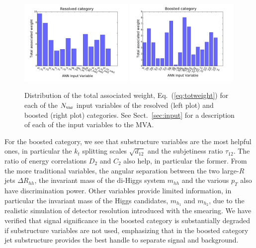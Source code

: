 \begin{figure}[t]
\begin{center}
\includegraphics[width=0.49\textwidth]{plots/res_wgthist.pdf}
\includegraphics[width=0.49\textwidth]{plots/boosted_wgthist.pdf}
\vspace{-0.5cm}
\caption{\small
Distribution of the total associated weight,
Eq.~(\ref{eq:totweight}) for each of the $N_{\rm var}$ input
variables of the resolved (left plot) and boosted (right plot) categories.
%
See Sect.~\ref{sec:input} for a description of each of the input
variables to the MVA.
}
\label{fig:nnweights}
\end{center}
\end{figure}




For the boosted category, we see that substructure variables
are the most helpful ones, in particular the $k_t$ splitting scales
$\sqrt{d_{12}}$ and the subjetiness ratio $\tau_{12}$.
%
The ratio of energy correlations $D_2$ and $C_2$ also help,
in particular the former.
%
From the more traditional variables, the angular
separation between the two large-$R$ jets $\Delta R_{hh}$,
the invariant mass of the di-Higgs system $m_{hh}$ and the various
$p_T$ also have discrimination power.
%
Other variables provide limited information, in particular the invariant
mass of the Higgs candidates, $m_{h_1}$ and $m_{h_2}$, due to the realistic
simulation of detector resolution introduced with the smearing.
%
We have verified that signal significance in the boosted category is substantially
degraded if substructure variables are not used, emphasizing that
in the boosted category jet substructure provides the best handle
to separate signal and background.


